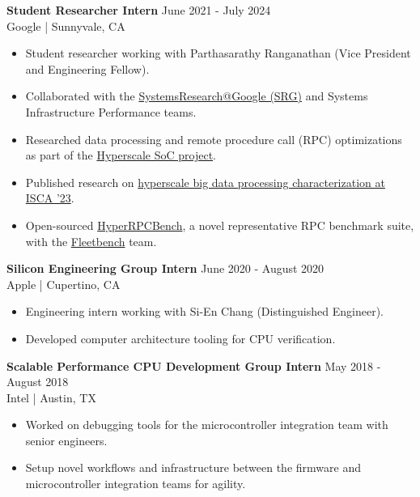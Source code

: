 \documentclass[line]{res}
\begin{document}
\begin{resume}
\textbf{Student Researcher Intern} \hfill June 2021 - July 2024
\\
Google | Sunnyvale, CA
\\
\vspace{-3mm}
\begin{itemize}
\item Student researcher working with Parthasarathy Ranganathan (Vice President and Engineering Fellow).
\item Collaborated with the \href{https://techsysinfra.google/research/}{SystemsResearch@Google (SRG)} and Systems Infrastructure Performance teams.
\item Researched data processing and remote procedure call (RPC) optimizations as part of the \hyperref[sec:hyperscale-soc]{Hyperscale SoC project}.
\item Published research on \hyperref[sec:iscapaper]{hyperscale big data processing characterization at ISCA '23}.
\item Open-sourced \href{https://github.com/google/fleetbench/tree/cd20746b68b307b148a761c676d6400f2541082d/fleetbench/rpc}{HyperRPCBench}, a novel representative RPC benchmark suite, with the \href{https://github.com/google/fleetbench}{Fleetbench} team.
\end{itemize}

\vspace{-1mm}

\textbf{Silicon Engineering Group Intern} \hfill June 2020 - August 2020
\\
Apple | Cupertino, CA
\\
\vspace{-3mm}
\begin{itemize}
\item Engineering intern working with Si-En Chang (Distinguished Engineer).
\item Developed computer architecture tooling for CPU verification.
\end{itemize}

\vspace{-1mm}

\textbf{Scalable Performance CPU Development Group Intern} \hfill May 2018 - August 2018
\\
Intel | Austin, TX
\\
\vspace{-3mm}
\begin{itemize}
\item Worked on debugging tools for the microcontroller integration team with senior engineers.
\item Setup novel workflows and infrastructure between the firmware and microcontroller integration teams for agility.
\end{itemize}


\end{resume}
\end{document}
